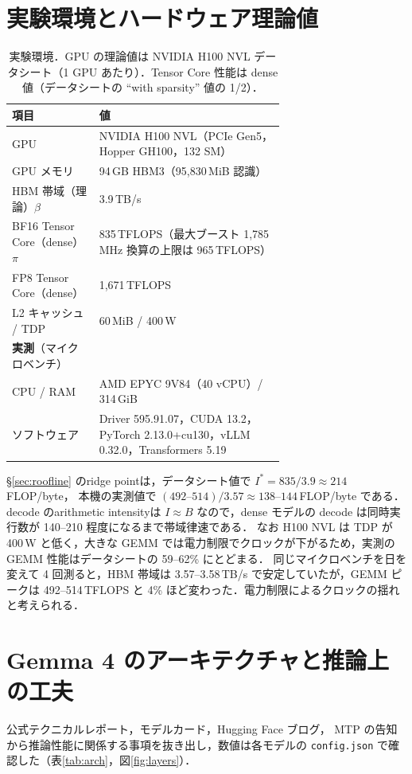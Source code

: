 \documentclass[a4paper,10pt]{ltjsarticle}
\begin{document}
\section{実験環境とハードウェア理論値}
\label{sec:env}
\begin{table}[htbp]\centering\small
\caption{実験環境．GPU の理論値は NVIDIA H100 NVL データシート\cite{h100}（1 GPU あたり）．Tensor Core 性能は dense 値（データシートの ``with sparsity'' 値の 1/2）．}
\label{tab:hw}
\begin{tabular}{lp{0.68\linewidth}}\toprule
項目 & 値 \\\midrule
GPU & NVIDIA H100 NVL（PCIe Gen5，Hopper GH100，132 SM）\\
GPU メモリ & 94\,GB HBM3（95{,}830\,MiB 認識）\\
HBM 帯域（理論）$\beta$ & 3.9\,TB/s \\
BF16 Tensor Core（dense）$\pi$ & 835\,TFLOPS（最大ブースト 1{,}785\,MHz 換算の上限は 965\,TFLOPS）\\
FP8 Tensor Core（dense） & 1{,}671\,TFLOPS \\
L2 キャッシュ / TDP & 60\,MiB / 400\,W \\
\textbf{実測}（マイクロベンチ） &  \\
CPU / RAM & AMD EPYC 9V84（40 vCPU）/ 314\,GiB \\
ソフトウェア & Driver 595.91.07，CUDA 13.2，PyTorch 2.13.0+cu130，vLLM 0.32.0，Transformers 5.19 \\
\bottomrule\end{tabular}
\end{table}

\S\ref{sec:roofline} のridge pointは，データシート値で $I^\ast = 835 / 3.9 \approx 214$\,FLOP/byte，
本機の実測値で $(492\text{--}514) / 3.57 \approx 138\text{--}144$\,FLOP/byte である．
decode のarithmetic intensityは $I \approx B$ なので，dense モデルの decode は同時実行数が 140--210 程度になるまで帯域律速である．
なお H100 NVL は TDP が 400\,W と低く，大きな GEMM では電力制限でクロックが下がるため，実測の GEMM 性能はデータシートの 59--62\% にとどまる．
同じマイクロベンチを日を変えて 4 回測ると，HBM 帯域は 3.57--3.58\,TB/s で安定していたが，GEMM ピークは 492--514\,TFLOPS と 4\% ほど変わった．電力制限によるクロックの揺れと考えられる．

\section{Gemma 4 のアーキテクチャと推論上の工夫}
\label{sec:arch}
公式テクニカルレポート\cite{gemma4tr}，モデルカード\cite{gemma4card}，Hugging Face ブログ\cite{hfblog}，
MTP の告知\cite{gemma4x,mtpblog}から推論性能に関係する事項を抜き出し，数値は各モデルの \texttt{config.json} で確認した（表\ref{tab:arch}，図\ref{fig:layers}）．
\end{document}
